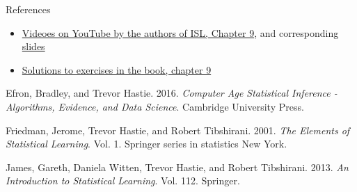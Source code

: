 \documentclass[10pt,ignorenonframetext,]{beamer}
\providecommand{\tightlist}{%
  \setlength{\itemsep}{0pt}\setlength{\parskip}{0pt}}
\begin{document}
\begin{frame}{References}

\begin{itemize}
\tightlist
\item
  \href{https://www.youtube.com/playlist?list=PL5-da3qGB5IDl6MkmovVdZwyYOhpCxo5o}{Videoes
  on YouTube by the authors of ISL, Chapter 9}, and corresponding
  \href{https://lagunita.stanford.edu/c4x/HumanitiesScience/StatLearning/asset/svm.pdf}{slides}
\item
  \href{https://rpubs.com/ppaquay/65566}{Solutions to exercises in the
  book, chapter 9}
\end{itemize}

\hypertarget{refs}{}
\hypertarget{ref-casi}{}
Efron, Bradley, and Trevor Hastie. 2016. \emph{Computer Age Statistical
Inference - Algorithms, Evidence, and Data Science}. Cambridge
University Press.

\hypertarget{ref-ESL}{}
Friedman, Jerome, Trevor Hastie, and Robert Tibshirani. 2001. \emph{The
Elements of Statistical Learning}. Vol. 1. Springer series in statistics
New York.

\hypertarget{ref-ISL}{}
James, Gareth, Daniela Witten, Trevor Hastie, and Robert Tibshirani.
2013. \emph{An Introduction to Statistical Learning}. Vol. 112.
Springer.

\end{frame}
\end{document}
